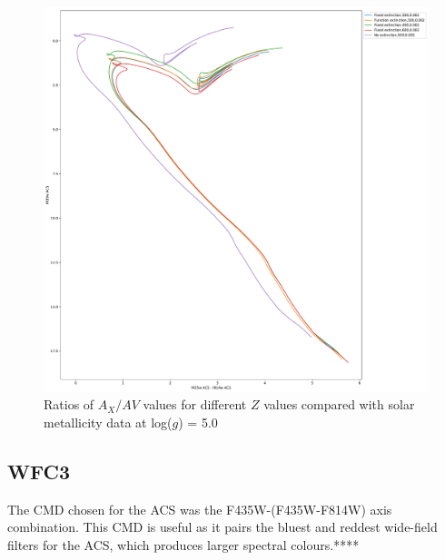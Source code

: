 \documentclass[12pt, a4paper]{report}
\begin{document}
\begin{figure}[h]
\begin{center}
\includegraphics[scale=0.3]{../basti_isochrones_10_13Gyr/Extinction_T50k_FeH0fix_func_f435wACS_f435wACSmf814wACS_500_400_600_Myr_FeH_0p002_ref_noext_Av_1p0.pdf}
\caption{Ratios of $A_{X}/A{V}$ values for different $Z$ values compared with solar metallicity data at log($g$) = 5.0}
\label{acs_isoc_T50k}
\end{center}
\end{figure}

\subsection{WFC3} \label{WFC3_isoc}

The CMD chosen for the ACS was the F435W-(F435W-F814W) axis combination. This CMD is useful as it pairs the bluest and reddest wide-field filters for the ACS, which produces larger spectral colours.****
\end{document}
